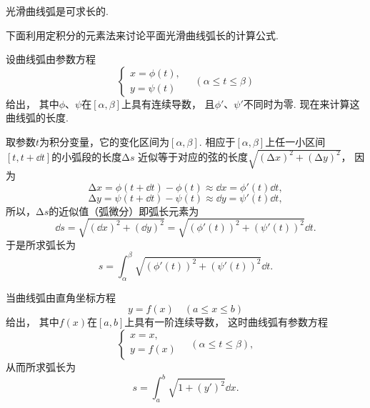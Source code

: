 \begin{theorem}
光滑曲线弧是可求长的.
\end{theorem}

下面利用定积分的元素法来讨论平面光滑曲线弧长的计算公式.

设曲线弧由参数方程\[
	\left\{ \begin{array}{l}
	x = \phi(t), \\
	y = \psi(t)
	\end{array} \right.
	\quad(\alpha \leq t \leq \beta)
\]给出，
其中\(\phi\)、\(\psi\)在\([\alpha,\beta]\)上具有连续导数，
且\(\phi'\)、\(\psi'\)不同时为零.
现在来计算这曲线弧的长度.

取参数\(t\)为积分变量，它的变化区间为\([\alpha,\beta]\).
相应于\([\alpha,\beta]\)上任一小区间\([t,t+\dd{t}]\)的小弧段的长度\(\increment s\)
近似等于对应的弦的长度\(\sqrt{(\increment x)^2+(\increment y)^2}\)，
因为\[
	\increment x
	= \phi(t+\dd{t})-\phi(t)
	\approx \dd{x}
	= \phi'(t) \dd{t},
\]\[
	\increment y
	= \psi(t+\dd{t})-\psi(t)
	\approx \dd{y}
	= \psi'(t) \dd{t},
\]
所以，\(\increment s\)的近似值（弧微分）即弧长元素为\[
	\dd{s} = \sqrt{(\dd{x})^2 + (\dd{y})^2}
	= \sqrt{(\phi'(t))^2 + (\psi'(t))^2} \dd{t}.
\]
于是所求弧长为\begin{equation}
	s = \int_\alpha^\beta \sqrt{(\phi'(t))^2 + (\psi'(t))^2} \dd{t}.
\end{equation}

当曲线弧由直角坐标方程\[
	y = f(x) \quad(a \leq x \leq b)
\]给出，
其中\(f(x)\)在\([a,b]\)上具有一阶连续导数，
这时曲线弧有参数方程\[
	\left\{ \begin{array}{l}
		x = x, \\
		y = f(x)
	\end{array} \right.
	\quad(\alpha \leq t \leq \beta),
\]
从而所求弧长为\begin{equation}
	s = \int_a^b \sqrt{1+(y')^2} \dd{x}.
\end{equation}

